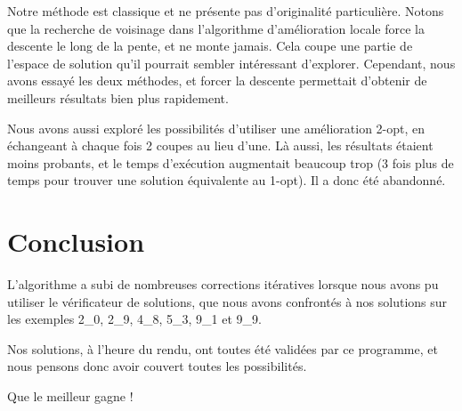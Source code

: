 \documentclass[10pt,a4paper]{article}
\begin{document}
Notre méthode est classique et ne présente pas d'originalité particulière. Notons que la recherche de voisinage dans l'algorithme d'amélioration locale force la descente le long de la pente, et ne monte jamais. Cela coupe une partie de l'espace de solution qu'il pourrait sembler intéressant d'explorer. Cependant, nous avons essayé les deux méthodes, et forcer la descente permettait d'obtenir de meilleurs résultats bien plus rapidement.

Nous avons aussi exploré les possibilités d'utiliser une amélioration 2-opt, en échangeant à chaque fois 2 coupes au lieu d'une. Là aussi, les résultats étaient moins probants, et le temps d'exécution augmentait beaucoup trop (3 fois plus de temps pour trouver une solution équivalente au 1-opt). Il a donc été abandonné.

\newpage

\section{Conclusion}

L'algorithme a subi de nombreuses corrections itératives lorsque nous avons pu utiliser le vérificateur de solutions, que nous avons confrontés à nos solutions sur les exemples 2\_0, 2\_9, 4\_8, 5\_3, 9\_1 et 9\_9.

Nos solutions, à l'heure du rendu, ont toutes été validées par ce programme, et nous pensons donc avoir couvert toutes les possibilités.

Que le meilleur gagne !
\end{document}
